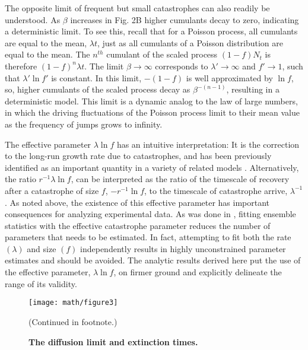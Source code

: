 The opposite limit of frequent but small catastrophes can also readily be understood. As $\beta$ increases in Fig. 2B higher cumulants decay to zero, indicating a deterministic limit. To see this, recall that for a Poisson process, all cumulants are equal to the mean, $\lambda t$, just as all cumulants of a Poisson distribution are equal to the mean.  The $n^{th}$ cumulant of the scaled process $(1-f)N_t$ is therefore $(1-f)^n\lambda t$. The limit $\beta \to \infty$ corresponds to $\lambda'\to\infty$ and $f'\to 1$, such that $\lambda'\ln f'$ is constant.  In this limit, $-(1-f)$ is well approximated by $\ln f$, so, higher cumulants of the scaled process decay as $\beta^{-(n-1)}$, resulting in a deterministic model. This limit is a dynamic analog to the law of large numbers, in which the driving fluctuations of the Poisson process limit to their mean value as the frequency of jumps grows to infinity. 

The effective parameter $\lambda\ln f$ has an intuitive interpretation:  It is the correction to the long-run growth rate due to catastrophes, and has been previously identified as an important quantity in a variety of related models \cite{bao2011competitive,hansonBook,lande1993risks}.  Alternatively, the ratio $r^{-1}\lambda\ln f$, can be interpreted as the ratio of the timescale of recovery after a catastrophe of size $f$, $-r^{-1}\ln f$, to the timescale of catastrophe arrive, $\lambda^{-1}$. As noted above, the existence of this effective parameter has important consequences for analyzing experimental data.  As was done in \cite{wilesPLOS2016}, fitting ensemble statistics with the effective catastrophe parameter reduces the number of parameters that needs to be estimated.  In fact, attempting to fit both the rate $(\lambda)$ and size $(f)$ independently results in highly unconstrained parameter estimates  \cite{wilesPLOS2016} and should be avoided.  The analytic results derived here put the use of the effective parameter, $\lambda\ln f$, on firmer ground and explicitly delineate the range of its validity.  

 \begin{figure}
	\centerline{
		\texttt{[image: math/figure3]}}
	\caption{\textbf{The diffusion limit and extinction times.}} {(Continued in footnote.)}
	\label{fig:math_fig3}
\end{figure}

